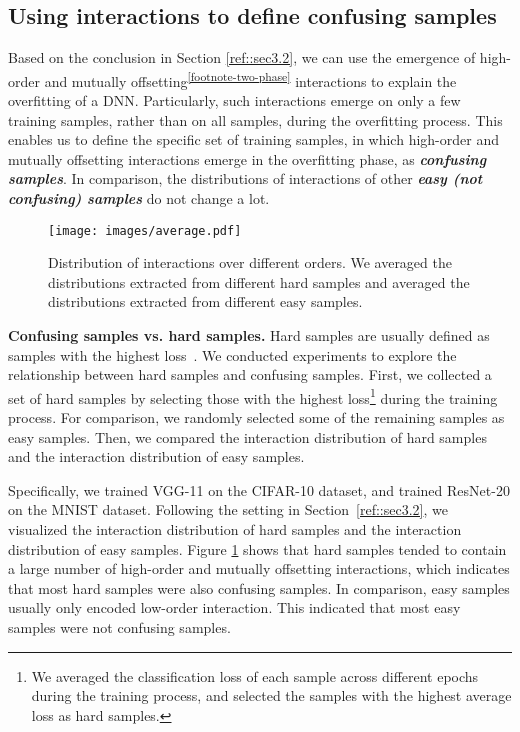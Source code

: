 \documentclass[10pt,twocolumn,letterpaper]{article}
\begin{document}
\subsection{Using interactions to define confusing samples}\label{red::sec3.3}
Based on the conclusion in Section \ref{ref::sec3.2}, we can use the emergence of high-order and mutually offsetting\textsuperscript{\ref{footnote-two-phase}} interactions to explain the overfitting of a DNN. Particularly, such interactions emerge on only a few training samples, rather than on all samples, during the overfitting process.
This enables us to define the specific set of training samples, in which high-order and mutually offsetting interactions emerge in the overfitting phase, as \textbf{\textit{confusing samples}}. In comparison, the distributions of interactions of other \textbf{\textit{easy (not confusing) samples}} do not change a lot.

\begin{figure}[t]
    \centering
    \texttt{[image: images/average.pdf]}
    \vspace{-10pt}
    \caption{Distribution of interactions over different orders. We averaged the distributions extracted from different hard samples and averaged the distributions extracted from different easy samples.}
    \vspace{-5pt}
    \label{img::average-samples}
\end{figure}

\textbf{Confusing samples vs. hard samples.}
Hard samples are usually defined as samples with the highest loss~\citep{lin2017focal}. We conducted experiments to explore the relationship between hard samples and confusing samples. First, we collected a set of hard samples by selecting those with the highest loss\footnote[9]{We averaged the classification loss of each sample across different epochs during the training process, and selected the samples with the highest average loss as hard samples.} during the training process. For comparison, we randomly selected some of the remaining samples as easy samples. Then, we compared the interaction distribution of hard samples and the interaction distribution of easy samples.

Specifically, we trained VGG-11 on the CIFAR-10 dataset, and trained ResNet-20 on the MNIST dataset. Following the setting in Section~\ref{ref::sec3.2}, we visualized the interaction distribution of hard samples and the interaction distribution of easy samples. Figure \ref{img::average-samples} shows that hard samples tended to contain a large number of high-order and mutually offsetting interactions, which indicates that most hard samples were also confusing samples. In comparison, easy samples usually only encoded low-order interaction. This indicated that most easy samples were not confusing samples.
\end{document}
